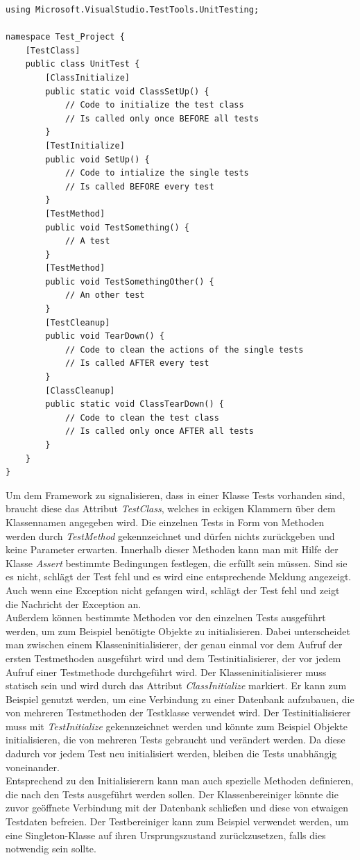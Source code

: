 \pagebreak
\begin{lstlisting}[caption={[Unit Test mit MSTest]Unit Test mit MSTest\\
Beispiel einer Testklasse in MSTest. Zeigt wie man ihre Testmethoden deklariert und wie sie initialisiert wird.}, label=code:UnitTestMitMSTest]
using Microsoft.VisualStudio.TestTools.UnitTesting;

namespace Test_Project {
	[TestClass]
	public class UnitTest {
		[ClassInitialize]
		public static void ClassSetUp() {
			// Code to initialize the test class
			// Is called only once BEFORE all tests
		}
		[TestInitialize]
		public void SetUp() {
			// Code to intialize the single tests
			// Is called BEFORE every test
		}
		[TestMethod]
		public void TestSomething() {
			// A test
		}			
		[TestMethod]
		public void TestSomethingOther() {
			// An other test
		}
		[TestCleanup]
		public void TearDown() {
			// Code to clean the actions of the single tests
			// Is called AFTER every test
		}
		[ClassCleanup]
		public static void ClassTearDown() {
			// Code to clean the test class
			// Is called only once AFTER all tests
		}
	}
}
\end{lstlisting}
\pagebreak

Um dem Framework zu signalisieren, dass in einer Klasse Tests vorhanden sind, braucht diese das Attribut \textit{TestClass}, welches in eckigen Klammern über dem Klassennamen angegeben wird. Die einzelnen Tests in Form von Methoden werden durch \textit{TestMethod} gekennzeichnet und dürfen nichts zurückgeben und keine Parameter erwarten. Innerhalb dieser Methoden kann man mit Hilfe der Klasse \textit{Assert} bestimmte Bedingungen festlegen, die erfüllt sein müssen. Sind sie es nicht, schlägt der Test fehl und es wird eine entsprechende Meldung angezeigt. Auch wenn eine Exception nicht gefangen wird, schlägt der Test fehl und zeigt die Nachricht der Exception an.\\
Außerdem können bestimmte Methoden vor den einzelnen Tests ausgeführt werden, um zum Beispiel benötigte Objekte zu initialisieren. Dabei unterscheidet man zwischen einem Klasseninitialisierer, der genau einmal vor dem Aufruf der ersten Testmethoden ausgeführt wird und dem Testinitialisierer, der vor jedem Aufruf einer Testmethode durchgeführt wird. Der Klasseninitialisierer muss statisch sein und wird durch das Attribut \textit{ClassInitialize} markiert. Er kann zum Beispiel genutzt werden, um eine Verbindung zu einer Datenbank aufzubauen, die von mehreren Testmethoden der Testklasse verwendet wird. Der Testinitialisierer muss mit \textit{TestInitialize} gekennzeichnet werden und könnte zum Beispiel Objekte initialisieren, die von mehreren Tests gebraucht und verändert werden. Da diese dadurch vor jedem Test neu initialisiert werden, bleiben die Tests unabhängig voneinander.\\
Entsprechend zu den Initialisierern kann man auch spezielle Methoden definieren, die nach den Tests ausgeführt werden sollen. Der Klassenbereiniger könnte die zuvor geöffnete Verbindung mit der Datenbank schließen und diese von etwaigen Testdaten befreien. Der Testbereiniger kann zum Beispiel verwendet werden, um eine Singleton-Klasse auf ihren Ursprungszustand zurückzusetzen, falls dies notwendig sein sollte.

